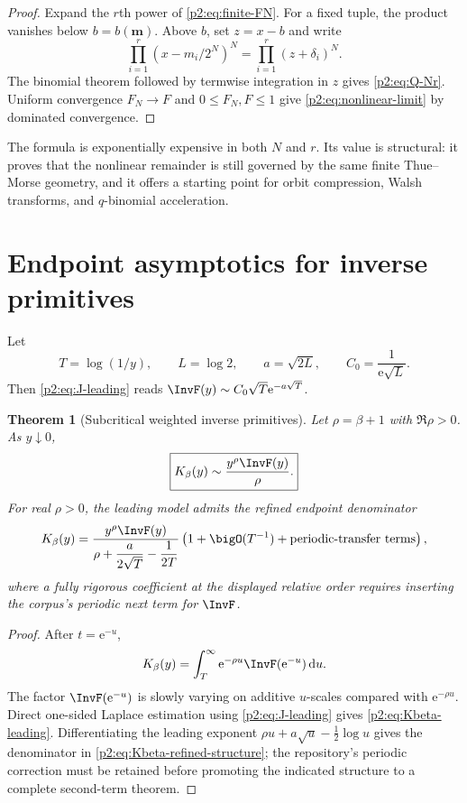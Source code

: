 \documentclass[11pt,oneside]{article}
\newtheorem{theorem}{Theorem}[section]
\theoremstyle{definition}
\theoremstyle{remark}
\newcommand{\dd}{\,\mathrm d}
\newcommand{\e}{\mathrm e}
\newcommand{\1}{\mathbf 1}
\begin{document}
\begin{proof}
Expand the $r$th power of \eqref{p2:eq:finite-FN}.  For a fixed tuple, the product
vanishes below $b=b(\bm m)$.  Above $b$, set $z=x-b$ and write
\[
 \prod_{i=1}^{r}(x-m_i/2^N)^N
 =\prod_{i=1}^{r}(z+\delta_i)^N.
\]
The binomial theorem followed by termwise integration in $z$ gives
\eqref{p2:eq:Q-Nr}.  Uniform convergence $F_N\to F$ and $0\le F_N,F\le1$ give
\eqref{p2:eq:nonlinear-limit} by dominated convergence.
\end{proof}

The formula is exponentially expensive in both $N$ and $r$.  Its value is
structural: it proves that the nonlinear remainder is still governed by the
same finite Thue--Morse geometry, and it offers a starting point for orbit
compression, Walsh transforms, and $q$-binomial acceleration.

\section{Endpoint asymptotics for inverse primitives}
\label{p2:sec:inverse-endpoint}

Let
\begin{equation}
 T=\log(1/y),\qquad L=\log2,\qquad
 a=\sqrt{2L},\qquad C_0=\frac1{\e\sqrt L}.                 \label{p2:eq:endpoint-constants}
\end{equation}
Then \eqref{p2:eq:J-leading} reads
$\InvF(y)\sim C_0\sqrt T\e^{-a\sqrt T}$.

\begin{theorem}[Subcritical weighted inverse primitives]
\label{p2:thm:inverse-endpoint-subcritical}
Let $\rho=\beta+1$ with $\Re\rho>0$.  As $y\downarrow0$,
\begin{equation}
 \boxed{
 K_\beta(y)\sim\frac{y^\rho\InvF(y)}{\rho}.}              \label{p2:eq:Kbeta-leading}
\end{equation}
For real $\rho>0$, the leading model admits the refined endpoint denominator
\begin{equation}
 K_\beta(y)=
 \frac{y^\rho\InvF(y)}{\rho+\dfrac{a}{2\sqrt T}-\dfrac1{2T}}
 \left(1+\bigO(T^{-1})+\text{periodic-transfer terms}\right), \label{p2:eq:Kbeta-refined-structure}
\end{equation}
where a fully rigorous coefficient at the displayed relative order requires
inserting the corpus's periodic next term for $\InvF$.
\end{theorem}

\begin{proof}
After $t=\e^{-u}$,
\[
 K_\beta(y)=\int_T^\infty\e^{-\rho u}\InvF(\e^{-u})\dd u.
\]
The factor $\InvF(\e^{-u})$ is slowly varying on additive $u$-scales compared
with $\e^{-\rho u}$.  Direct one-sided Laplace estimation using
\eqref{p2:eq:J-leading} gives \eqref{p2:eq:Kbeta-leading}.  Differentiating the
leading exponent
$\rho u+a\sqrt u-\frac12\log u$ gives the denominator in
\eqref{p2:eq:Kbeta-refined-structure}; the repository's periodic correction must
be retained before promoting the indicated structure to a complete second-term
theorem.
\end{proof}
\end{document}
